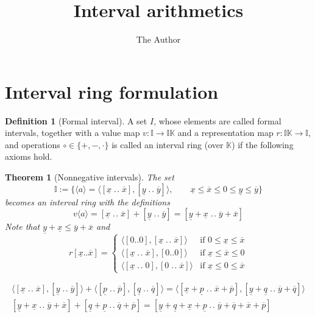 \documentclass[11pt,,amssymb]{amsart}
\title{Interval arithmetics}
\author{The Author}
\DeclareMathOperator{\till}{.\!.}
\begin{document}
\maketitle

\section{Interval ring formulation}

\theoremstyle{definition}
\newtheorem*{defn}{Definition}
\theoremstyle{plain}
\newtheorem*{thm}{Theorem}
  
\begin{defn}[Formal interval]
A set $I$, whose elements are called formal intervals, together with a value map $v : \mathbb{I} \to \mathbb{IK}$ and a representation map $r: \mathbb{IK} \to \mathbb{I}$, and operations $\circ \in \{+,-,\cdot\}$ is called an interval ring (over $\mathbb{K}$) if the following axioms hold.
\end{defn}

\begin{thm}[Nonnegative intervals]
The set
$$
\mathbb{I} :=\{\langle a \rangle =\langle [\underline{x}\till\overline{x}],[\underline{y}\till\overline{y}] \rangle, \qquad 
\underline{x}\leqslant \overline{x}\leqslant 0 \leqslant\underline{y}\leqslant\overline{y}\}
$$
becomes an interval ring with the definitions
$$
v\langle a \rangle = [\underline{x}\till\overline{x}] + [\underline{y}\till\overline{y}] = 
[\underline{y}+\underline{x}\till \overline{y}+\overline{x}]
$$
Note that $\underline{y}+\underline{x} \leqslant \overline{y}+\overline{x}$
and
$$
r[\underline{x}..\overline{x}] = 
\begin{cases}
\langle [0..0],[\underline{x}\till\overline{x}] \rangle & \text{if $0 \leqslant\underline{x}\leqslant\overline{x}$} \\
\langle [\underline{x}\till\overline{x}],[0..0] \rangle & \text{if $\underline{x}\leqslant \overline{x}\leqslant 0$} \\
\langle [\underline{x}\till0],[0\till\overline{x}] \rangle & \text{if $\underline{x}\leqslant 0\leqslant \overline{x}$}
\end{cases}
$$
\end{thm}

\begin{align}
\langle [\underline{x}\till\overline{x}],[\underline{y}\till\overline{y}] \rangle + 
\langle [\underline{p}\till\overline{p}],[\underline{q}\till\overline{q}] \rangle =
\langle [\underline{x}+\underline{p}\till\overline{x}+\overline{p}],[\underline{y}+\underline{q}\till\overline{y}+\overline{q}] \rangle
\\
[\underline{y}+\underline{x}\till \overline{y}+\overline{x}] + 
[\underline{q}+\underline{p}\till\overline{q}+\overline{p}] =
[\underline{y}+\underline{q}+\underline{x}+\underline{p}\till\overline{y}+\overline{q} + \overline{x}+\overline{p}]
\end{align}
\end{document}
